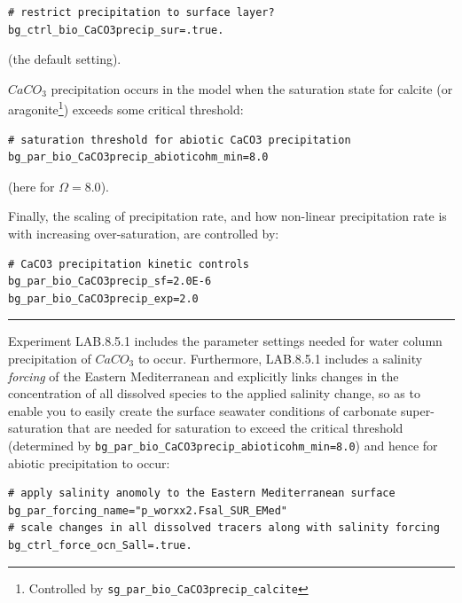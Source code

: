 \vspace{-2mm}\small\begin{verbatim}
# restrict precipitation to surface layer?
bg_ctrl_bio_CaCO3precip_sur=.true.
\end{verbatim}\normalsize\vspace{-2mm}
(the default setting).

$CaCO_{3}$ precipitation occurs in the model when the saturation state for calcite (or aragonite\footnote{Controlled by \texttt{sg\_par\_bio\_CaCO3precip\_calcite}}) exceeds some critical threshold:

\vspace{-2mm}\small\begin{verbatim}
# saturation threshold for abiotic CaCO3 precipitation
bg_par_bio_CaCO3precip_abioticohm_min=8.0
\end{verbatim}\normalsize\vspace{-2mm}
(here for $\Omega = 8.0$).

Finally, the scaling of precipitation rate, and how non-linear precipitation rate is with increasing over-saturation, are controlled by:

\vspace{-2mm}\small\begin{verbatim}
# CaCO3 precipitation kinetic controls
bg_par_bio_CaCO3precip_sf=2.0E-6
bg_par_bio_CaCO3precip_exp=2.0
\end{verbatim}\normalsize\vspace{-2mm}

\vspace{1mm}\noindent\rule{4cm}{0.1mm}\vspace{2mm}

\noindent Experiment \textsf{\footnotesize LAB.8.5.1} includes the parameter settings needed for water column precipitation of $CaCO_{3}$ to occur. Furthermore, \textsf{\footnotesize LAB.8.5.1} includes a salinity \textit{forcing} of the Eastern Mediterranean and explicitly links changes in the concentration of all dissolved species to the applied salinity change, so as to enable you to easily create the surface seawater conditions of carbonate super-saturation that are needed for saturation to exceed the critical threshold (determined by \texttt{\small bg\_par\_bio\_CaCO3precip\_abioticohm\_min=8.0}) and hence for abiotic precipitation to occur:

\vspace{-2mm}\small\begin{verbatim}
# apply salinity anomoly to the Eastern Mediterranean surface
bg_par_forcing_name="p_worxx2.Fsal_SUR_EMed"
# scale changes in all dissolved tracers along with salinity forcing
bg_ctrl_force_ocn_Sall=.true.
\end{verbatim}\normalsize\vspace{-2mm}

